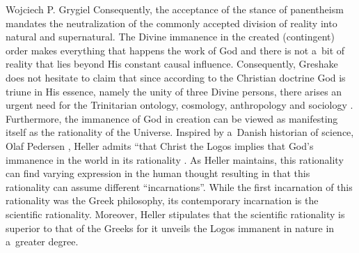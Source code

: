 \begin{artengenv}{Wojciech P. Grygiel}
{}
Consequently, the acceptance of the stance of panentheism mandates the neutralization of the commonly accepted division of reality into natural and supernatural. The Divine immanence in the created (contingent) order makes everything that happens the work of God and there is not a~bit of reality that lies beyond His constant causal influence. Consequently, Greshake does not hesitate to claim that since according to the Christian doctrine God is triune in His essence, namely the unity of three Divine persons, there arises an urgent need for the Trinitarian ontology, cosmology, anthropology and sociology
\parencite[][p.42]{greshake_dreieine_1997}. %
 Furthermore, the immanence of God in creation can be viewed as manifesting itself as the rationality of the Universe. Inspired by a~Danish historian of science, Olaf Pedersen 
\parencite*[][pp.63–65]{pedersen_two_2007}, %
 Heller admits ``that Christ the Logos implies that God’s immanence in the world in its rationality 
\parencite[][p.57]{heller_scientific_2003}. %
 As Heller maintains, this rationality can find varying expression in the human thought resulting in that this rationality can assume different ``incarnations''. While the first incarnation of this rationality was the Greek philosophy, its contemporary incarnation is the scientific rationality. Moreover, Heller 
\parencite*[][]{heller_teologia_2016} %
 stipulates that the scientific rationality is superior to that of the Greeks for it unveils the Logos immanent in nature in a~greater degree.


\end{artengenv}
